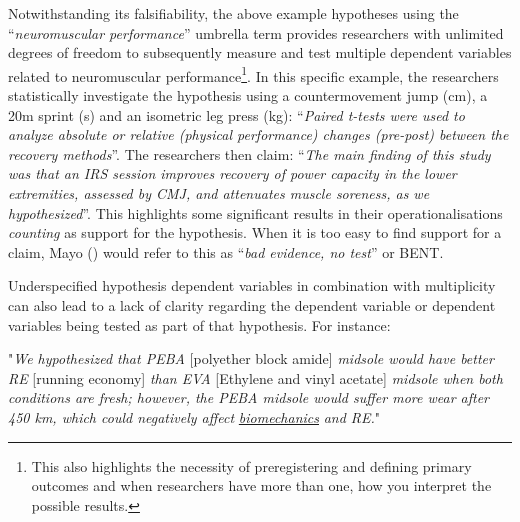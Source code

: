 \documentclass[
]{article}
\begin{document}
Notwithstanding its falsifiability, the above example hypotheses using
the ``\emph{neuromuscular performance}'' umbrella term provides
researchers with unlimited degrees of freedom to subsequently measure
and test multiple dependent variables related to neuromuscular
performance\footnote{This also highlights the necessity of
  preregistering and defining primary outcomes and when researchers have
  more than one, how you interpret the possible results.}. In this
specific example, the researchers statistically investigate the
hypothesis using a countermovement jump (cm), a 20m sprint (s) and an
isometric leg press (kg): ``\emph{Paired t-tests were used to analyze
absolute or relative (physical performance) changes (pre-post) between
the recovery methods}''. The researchers then claim: ``\emph{The main
finding of this study was that an IRS session improves recovery of power
capacity in the lower extremities, assessed by CMJ, and attenuates
muscle soreness, as we hypothesized}''. This highlights some significant
results in their operationalisations \emph{counting} as support for the
hypothesis. When it is too easy to find support for a claim, Mayo
() would refer to this as
``\emph{bad evidence, no test}'' or BENT.

Underspecified hypothesis dependent variables in combination with
multiplicity can also lead to a lack of clarity regarding the dependent
variable or dependent variables being tested as part of that hypothesis.
For instance:

\begin{center}

"\textit{We hypothesized that PEBA} [polyether block amide] \textit{midsole would have better RE} [running economy] \textit{than EVA} [Ethylene and vinyl acetate] \textit{midsole when both conditions are fresh; however, the PEBA midsole would suffer more wear after 450 km, which could negatively affect} \underline{\textit{biomechanics}} \textit{and RE.}"

\end{center}
\end{document}
